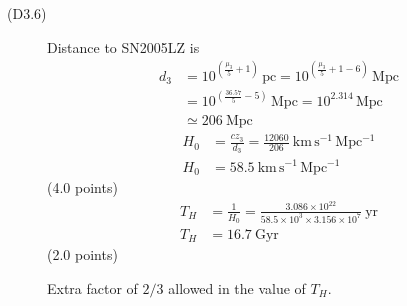 \begin{description}
\item[(D3.6)] Distance to SN2005LZ is
  \begin{align*}
    d_3 &= 10^{\left(\frac{\mu_3}{5}+1\right)}\,\mathrm{pc}
        = 10^{\left(\frac{\mu_3}{5}+1-6\right)}\,\mathrm{Mpc} \\
        &= 10^{\left(\frac{36.57}{5}-5\right)}\,\mathrm{Mpc}
        = 10^{2.314}\,\mathrm{Mpc} \\
        &\simeq 206\ \mathrm{Mpc}
  \end{align*}
  \begin{align*}
    H_0 &= \frac{c z_3}{d_3}
      = \frac{12060}{206}\ \mathrm{km\,s^{-1}\,Mpc^{-1}} \\
    H_0 &= 58.5\ \mathrm{km\,s^{-1}\,Mpc^{-1}}
  \end{align*}
  \hfill(4.0 points)
  \begin{align*}
    T_H &= \frac{1}{H_0}
      = \frac{3.086\times 10^{22}}{58.5\times 10^{3}\times 3.156\times 10^{7}}
      \ \mathrm{yr} \\
    T_H &= 16.7\ \mathrm{Gyr}
  \end{align*}
  \hfill(2.0 points)

  Extra factor of $2/3$ allowed in the value of $T_H$.
\end{description}

